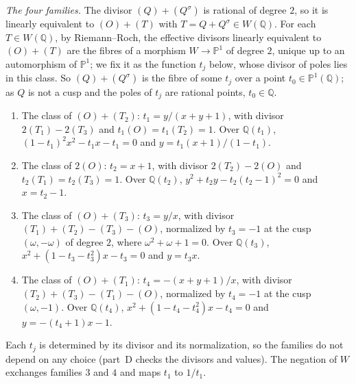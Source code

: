 \documentclass[11pt]{article}
\newcommand{\Q}{\mathbb Q}
\begin{document}
\emph{The four families.} The divisor \((Q)+(Q^\sigma)\) is rational of degree \(2\), so it is
linearly equivalent to \((O)+(T)\) with \(T=Q+Q^\sigma\in W(\Q)\). For each \(T\in W(\Q)\), by
Riemann--Roch, the effective divisors linearly equivalent to \((O)+(T)\) are the fibres of a morphism
\(W\to\mathbb P^1\) of degree \(2\), unique up to an automorphism of \(\mathbb P^1\); we fix it as the
function \(t_j\) below, whose divisor of poles lies in this class. So \((Q)+(Q^\sigma)\) is the fibre
of some \(t_j\) over a point \(t_0\in\mathbb P^1(\Q)\); as \(Q\) is not a cusp and the poles of
\(t_j\) are rational points, \(t_0\in\Q\).
\begin{enumerate}
\item[(1)] The class of \((O)+(T_2)\): \(t_1=y/(x+y+1)\), with divisor \(2(T_1)-2(T_3)\) and
\(t_1(O)=t_1(T_2)=1\). Over \(\Q(t_1)\), \((1-t_1)^2x^2-t_1x-t_1=0\) and \(y=t_1(x+1)/(1-t_1)\).
\item[(2)] The class of \(2(O)\): \(t_2=x+1\), with divisor \(2(T_2)-2(O)\) and
\(t_2(T_1)=t_2(T_3)=1\). Over \(\Q(t_2)\), \(y^2+t_2y-t_2(t_2-1)^2=0\) and \(x=t_2-1\).
\item[(3)] The class of \((O)+(T_3)\): \(t_3=y/x\), with divisor \((T_1)+(T_2)-(T_3)-(O)\),
normalized by \(t_3=-1\) at the cusp \((\omega,-\omega)\) of degree \(2\), where \(\omega^2+\omega+1=0\).
Over \(\Q(t_3)\), \(x^2+(1-t_3-t_3^2)x-t_3=0\) and \(y=t_3x\).
\item[(4)] The class of \((O)+(T_1)\): \(t_4=-(x+y+1)/x\), with divisor \((T_2)+(T_3)-(T_1)-(O)\),
normalized by \(t_4=-1\) at the cusp \((\omega,-1)\). Over \(\Q(t_4)\), \(x^2+(1-t_4-t_4^2)x-t_4=0\)
and \(y=-(t_4+1)x-1\).
\end{enumerate}
Each \(t_j\) is determined by its divisor and its normalization, so the families do not depend on
any choice (part~D checks the divisors and values). The negation of \(W\) exchanges families \(3\)
and \(4\) and maps \(t_1\) to \(1/t_1\).
\end{document}
